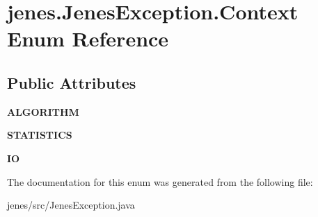 \hypertarget{enumjenes_1_1_jenes_exception_1_1_context}{\section{jenes.\-Jenes\-Exception.\-Context Enum Reference}
\label{enumjenes_1_1_jenes_exception_1_1_context}
}
\subsection*{Public Attributes}
\begin{DoxyCompactItemize}
\item 
\hypertarget{enumjenes_1_1_jenes_exception_1_1_context_ae925bab13906bd4450260c30cc7b4cab}{{\bfseries A\-L\-G\-O\-R\-I\-T\-H\-M}}\label{enumjenes_1_1_jenes_exception_1_1_context_ae925bab13906bd4450260c30cc7b4cab}

\item 
\hypertarget{enumjenes_1_1_jenes_exception_1_1_context_ae0335a1dcf69b5493fac24c4c2c25cd1}{{\bfseries S\-T\-A\-T\-I\-S\-T\-I\-C\-S}}\label{enumjenes_1_1_jenes_exception_1_1_context_ae0335a1dcf69b5493fac24c4c2c25cd1}

\item 
\hypertarget{enumjenes_1_1_jenes_exception_1_1_context_a023d03d781868c33bd25415d7c5602d0}{{\bfseries I\-O}}\label{enumjenes_1_1_jenes_exception_1_1_context_a023d03d781868c33bd25415d7c5602d0}

\end{DoxyCompactItemize}


The documentation for this enum was generated from the following file\-:\begin{DoxyCompactItemize}
\item 
jenes/src/Jenes\-Exception.\-java\end{DoxyCompactItemize}
